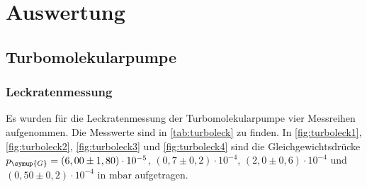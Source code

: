 \section{Auswertung}
\label{sec:Auswertung}

\subsection{Turbomolekularpumpe}
\subsubsection{Leckratenmessung}
Es wurden für die Leckratenmessung der Turbomolekularpumpe vier Messreihen aufgenommen. Die Messwerte sind in
\autoref{tab:turboleck} zu finden. In \autoref{fig:turboleck1}, \autoref{fig:turboleck2}, \autoref{fig:turboleck3}
und \autoref{fig:turboleck4} sind die Gleichgewichtsdrücke $p_{\symup{G}}=(6,00 \pm 1,80) \cdot 10^{-5}$,
$(0,7 \pm  0,2)\cdot 10^{-4}$, $(2,0 \pm 0,6) \cdot 10^{-4}$ und $(0,50 \pm 0,2) \cdot 10^{-4}$ in
$\si{\milli\bar}$ aufgetragen.
